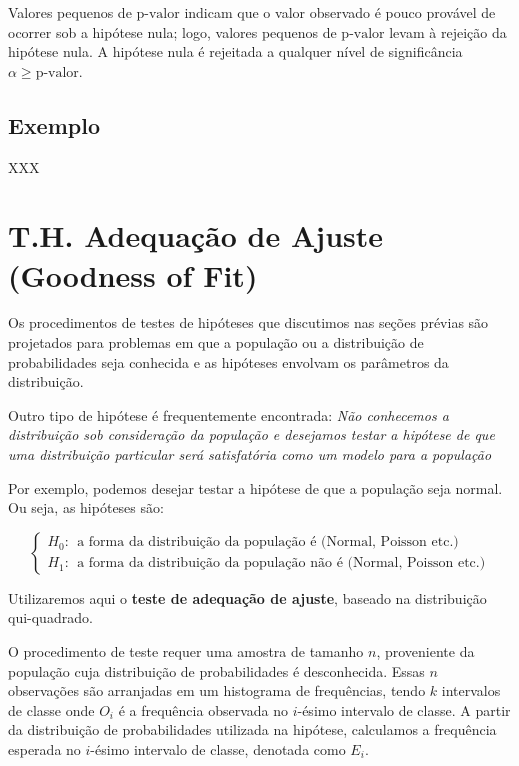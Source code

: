\documentclass[
]{book}
\begin{document}
Valores pequenos de \(\text{p-valor}\) indicam que o valor observado é pouco provável de ocorrer sob a hipótese nula; logo, valores pequenos de \(\text{p-valor}\) levam à rejeição da hipótese nula. A hipótese nula é rejeitada a qualquer nível de significância \(\alpha \geq \text{p-valor}\).

\hypertarget{exemplo-6}{%
\subsection{Exemplo}\label{exemplo-6}}

XXX

\hypertarget{t.h.-adequauxe7uxe3o-de-ajuste-goodness-of-fit}{%
\section{T.H. Adequação de Ajuste (Goodness of Fit)}\label{t.h.-adequauxe7uxe3o-de-ajuste-goodness-of-fit}}

Os procedimentos de testes de hipóteses que discutimos nas seções prévias são projetados para problemas em que a população ou a distribuição de probabilidades seja conhecida e as hipóteses envolvam os parâmetros da distribuição.

Outro tipo de hipótese é frequentemente encontrada: \emph{Não conhecemos a distribuição sob consideração da população e desejamos testar a hipótese de que uma distribuição particular será satisfatória como um modelo para a população}

Por exemplo, podemos desejar testar a hipótese de que a população seja normal. Ou seja, as hipóteses são:

\[
\begin{cases}
H_0:~~\text{a forma da distribuição da população é (Normal, Poisson etc.)}\\
H_1:~~\text{a forma da distribuição da população não é (Normal, Poisson etc.)}
\end{cases}
\]

Utilizaremos aqui o \textbf{teste de adequação de ajuste}, baseado na distribuição qui-quadrado.

O procedimento de teste requer uma amostra de tamanho \(n\), proveniente da população cuja distribuição de probabilidades é desconhecida. Essas \(n\) observações são arranjadas em um histograma de frequências, tendo \(k\) intervalos de classe onde \(O_i\) é a frequência observada no \(i\)-ésimo intervalo de classe. A partir da distribuição de probabilidades utilizada na hipótese, calculamos a frequência esperada no \(i\)-ésimo intervalo de classe, denotada como \(E_i\).
\end{document}
